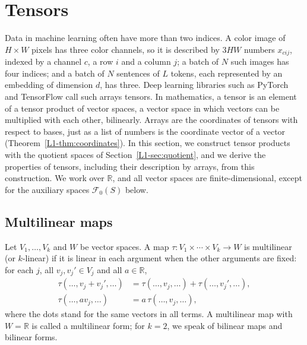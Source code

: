 \section{Tensors}\label{L1-sec:tensors}

Data in machine learning often have more than two indices. A color image of $H \times W$ pixels has three color channels, so it is described by $3HW$ numbers $x_{cij}$, indexed by a channel $c$, a row $i$ and a column $j$; a batch of $N$ such images has four indices; and a batch of $N$ sentences of $L$ tokens, each represented by an embedding of dimension $d$, has three. Deep learning libraries such as PyTorch and TensorFlow call such arrays tensors. In mathematics, a tensor is an element of a tensor product of vector spaces, a vector space in which vectors can be multiplied with each other, bilinearly. Arrays are the coordinates of tensors with respect to bases, just as a list of numbers is the coordinate vector of a vector (Theorem~\ref{L1-thm:coordinates}). In this section, we construct tensor products with the quotient spaces of Section~\ref{L1-sec:quotient}, and we derive the properties of tensors, including their description by arrays, from this construction. We work over $\mathbb{R}$, and all vector spaces are finite-dimensional, except for the auxiliary spaces $\mathcal{F}_0(S)$ below.

\subsection{Multilinear maps}

\begin{definition}\label{L1-def:multilinear}
    Let $V_1, \ldots, V_k$ and $W$ be vector spaces. A map $\tau: V_1 \times \cdots \times V_k \to W$ is multilinear (or $k$-linear) if it is linear in each argument when the other arguments are fixed: for each $j$, all $v_j, v_j' \in V_j$ and all $a \in \mathbb{R}$,
    \begin{align*}
        \tau(\ldots, v_j + v_j', \ldots) &= \tau(\ldots, v_j, \ldots) + \tau(\ldots, v_j', \ldots), \\
        \tau(\ldots, a v_j, \ldots) &= a\,\tau(\ldots, v_j, \ldots),
    \end{align*}
    where the dots stand for the same vectors in all terms. A multilinear map with $W = \mathbb{R}$ is called a multilinear form; for $k = 2$, we speak of bilinear maps and bilinear forms.
\end{definition}

